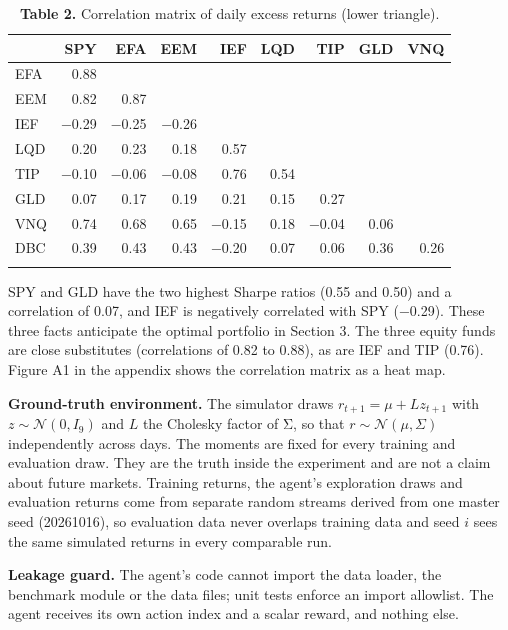 \documentclass[
  11pt]{article}
\begin{document}
\begin{table}[htbp]
\centering\small
\caption{\textbf{Table 2.} Correlation matrix of daily excess returns
(lower triangle).}
\begin{tabular}{@{}lrrrrrrrr@{}}
\toprule\noalign{}
& SPY & EFA & EEM & IEF & LQD & TIP & GLD & VNQ \\
\midrule\noalign{}
EFA & 0.88 & & & & & & & \\
EEM & 0.82 & 0.87 & & & & & & \\
IEF & −0.29 & −0.25 & −0.26 & & & & & \\
LQD & 0.20 & 0.23 & 0.18 & 0.57 & & & & \\
TIP & −0.10 & −0.06 & −0.08 & 0.76 & 0.54 & & & \\
GLD & 0.07 & 0.17 & 0.19 & 0.21 & 0.15 & 0.27 & & \\
VNQ & 0.74 & 0.68 & 0.65 & −0.15 & 0.18 & −0.04 & 0.06 & \\
DBC & 0.39 & 0.43 & 0.43 & −0.20 & 0.07 & 0.06 & 0.36 & 0.26 \\
\bottomrule\noalign{}
\end{tabular}
\end{table}

SPY and GLD have the two highest Sharpe ratios (0.55 and 0.50) and a
correlation of 0.07, and IEF is negatively correlated with SPY (−0.29).
These three facts anticipate the optimal portfolio in Section 3. The
three equity funds are close substitutes (correlations of 0.82 to 0.88),
as are IEF and TIP (0.76). Figure A1 in the appendix shows the
correlation matrix as a heat map.

\textbf{Ground-truth environment.} The simulator draws
\(r_{t+1} = \mu + L z_{t+1}\) with \(z \sim \mathcal{N}(0, I_9)\) and
\(L\) the Cholesky factor of Σ, so that
\(r \sim \mathcal{N}(\mu, \Sigma)\) independently across days. The
moments are fixed for every training and evaluation draw. They are the
truth inside the experiment and are not a claim about future markets.
Training returns, the agent's exploration draws and evaluation returns
come from separate random streams derived from one master seed
(20261016), so evaluation data never overlaps training data and seed
\(i\) sees the same simulated returns in every comparable run.

\textbf{Leakage guard.} The agent's code cannot import the data loader,
the benchmark module or the data files; unit tests enforce an import
allowlist. The agent receives its own action index and a scalar reward,
and nothing else.
\end{document}
